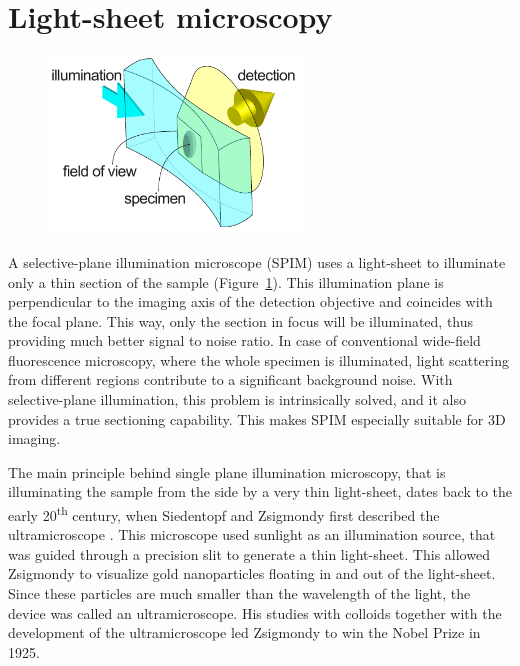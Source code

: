 

\section{Light-sheet microscopy}
  \label{sec:light-sheet}
  \begin{figure}[b!]
    \centering
    \includegraphics[width=0.6\textwidth]{spim_concept}
    \label{fig:spim_concept}
  \end{figure}

  A selective-plane illumination microscope (SPIM) uses a light-sheet to illuminate only a thin section of the sample (Figure~\ref{fig:spim_concept}). This illumination plane is perpendicular to the imaging axis of the detection objective and coincides with the focal plane. This way, only the section in focus will be illuminated, thus providing much better signal to noise ratio. In case of conventional wide-field fluorescence microscopy, where the whole specimen is illuminated, light scattering from different regions contribute to a significant background noise. With selective-plane illumination, this problem is intrinsically solved, and it also provides a true sectioning capability. This makes SPIM especially suitable for 3D imaging.

  

  The main principle behind single plane illumination microscopy, that is illuminating the sample from the side by a very thin light-sheet, dates back to the early 20\textsuperscript{th} century, when Siedentopf and Zsigmondy first described the ultramicroscope \cite{siedentopf_uber_1902}. This microscope used sunlight as an illumination source, that was guided through a precision slit to generate a thin light-sheet. This allowed Zsigmondy to visualize gold nanoparticles floating in and out of the light-sheet. Since these particles are much smaller than the wavelength of the light, the device was called an ultramicroscope. His studies with colloids together with the development of the ultramicroscope led Zsigmondy to win the Nobel Prize in 1925.

